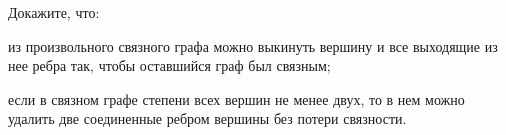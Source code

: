 Докажите, что:
\begin{enumcyr}
    \item из произвольного связного графа можно выкинуть вершину и все выходящие из нее ребра так, чтобы
        оставшийся граф был связным;
    \item если в связном графе степени всех вершин не менее двух, то в нем можно удалить две соединенные
        ребром вершины без потери связности.
\end{enumcyr}